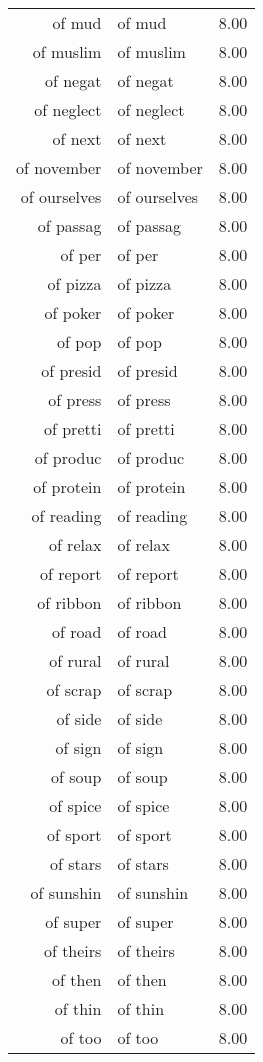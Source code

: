 \begin{table}[ht]
\begin{tabular}{rlr}
  of mud & of mud & 8.00 \\ 
  of muslim & of muslim & 8.00 \\ 
  of negat & of negat & 8.00 \\ 
  of neglect & of neglect & 8.00 \\ 
  of next & of next & 8.00 \\ 
  of november & of november & 8.00 \\ 
  of ourselves & of ourselves & 8.00 \\ 
  of passag & of passag & 8.00 \\ 
  of per & of per & 8.00 \\ 
  of pizza & of pizza & 8.00 \\ 
  of poker & of poker & 8.00 \\ 
  of pop & of pop & 8.00 \\ 
  of presid & of presid & 8.00 \\ 
  of press & of press & 8.00 \\ 
  of pretti & of pretti & 8.00 \\ 
  of produc & of produc & 8.00 \\ 
  of protein & of protein & 8.00 \\ 
  of reading & of reading & 8.00 \\ 
  of relax & of relax & 8.00 \\ 
  of report & of report & 8.00 \\ 
  of ribbon & of ribbon & 8.00 \\ 
  of road & of road & 8.00 \\ 
  of rural & of rural & 8.00 \\ 
  of scrap & of scrap & 8.00 \\ 
  of side & of side & 8.00 \\ 
  of sign & of sign & 8.00 \\ 
  of soup & of soup & 8.00 \\ 
  of spice & of spice & 8.00 \\ 
  of sport & of sport & 8.00 \\ 
  of stars & of stars & 8.00 \\ 
  of sunshin & of sunshin & 8.00 \\ 
  of super & of super & 8.00 \\ 
  of theirs & of theirs & 8.00 \\ 
  of then & of then & 8.00 \\ 
  of thin & of thin & 8.00 \\ 
  of too & of too & 8.00 \\ 

\end{tabular}
\end{table}
